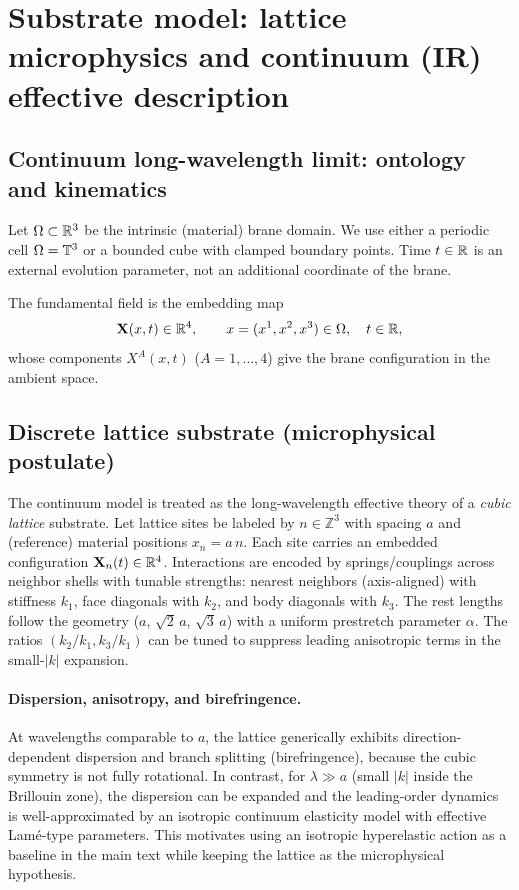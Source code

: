 \section{Substrate model: lattice microphysics and continuum (IR) effective description}
\label{sec:continuum-model}

\subsection{Continuum long-wavelength limit: ontology and kinematics}

Let $\Omega\subset\mathbb{R}^3$ be the intrinsic (material) brane domain.
We use either a periodic cell $\Omega=\mathbb{T}^3$ or a bounded cube with clamped boundary points.
Time $t\in\mathbb{R}$ is an external evolution parameter, not an additional coordinate of the brane.

The fundamental field is the embedding map
\begin{equation}
  \mathbf{X}(x,t)\in\mathbb{R}^4,
  \qquad x=(x^1,x^2,x^3)\in\Omega,\quad t\in\mathbb{R},
  \label{eq:fundamental-field}
\end{equation}
whose components $X^A(x,t)$ ($A=1,\dots,4$) give the brane configuration in the ambient space.

\subsection{Discrete lattice substrate (microphysical postulate)}
\label{subsec:lattice-substrate}

The continuum model is treated as the long-wavelength effective theory of a \emph{cubic lattice} substrate.
Let lattice sites be labeled by $n\in\mathbb{Z}^3$ with spacing $a$ and (reference) material positions
$x_n=a\,n$.
Each site carries an embedded configuration $\mathbf{X}_n(t)\in\mathbb{R}^4$.
Interactions are encoded by springs/couplings across neighbor shells with tunable strengths:
nearest neighbors (axis-aligned) with stiffness $k_1$, face diagonals with $k_2$, and body diagonals with $k_3$.
The rest lengths follow the geometry ($a$, $\sqrt{2}\,a$, $\sqrt{3}\,a$) with a uniform prestretch parameter $\alpha$.
The ratios $(k_2/k_1,k_3/k_1)$ can be tuned to suppress leading anisotropic terms in the small-$|k|$ expansion.

\paragraph{Dispersion, anisotropy, and birefringence.}
At wavelengths comparable to $a$, the lattice generically exhibits direction-dependent dispersion and branch
splitting (birefringence), because the cubic symmetry is not fully rotational.
In contrast, for $\lambda\gg a$ (small $|k|$ inside the Brillouin zone), the dispersion can be expanded and the
leading-order dynamics is well-approximated by an isotropic continuum elasticity model with effective Lam\'e-type
parameters.
This motivates using an isotropic hyperelastic action as a baseline in the main text while keeping the lattice
as the microphysical hypothesis.

